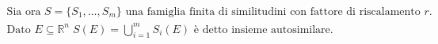\documentclass[preview]{standalone}
\begin{document}
\begin{align*}
\text{Sia ora }S = \{S_1, \dots, S_m\} \text{ una famiglia finita di similitudini con fattore di riscalamento } r.\\ \text{Dato } E \subseteq \mathbb{R}^n \; S(E) = \bigcup_{i=1}^m S_i(E) \text{ è detto insieme autosimilare.}
\end{align*}
\end{document}
